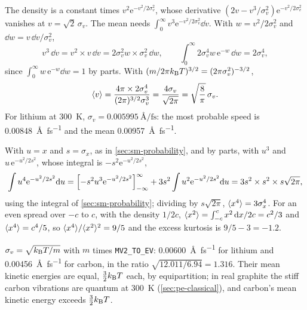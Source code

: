 The density is a constant times $v^2\mathrm{e}^
{-v^2/2\sigma_v^2}$, whose derivative $(2v - v^3/\sigma_v^2)\mathrm{e}^{
-v^2/2\sigma_v^2}$ vanishes at $v = \sqrt2\,\sigma_v$. The mean needs
$\int_0^\infty v^3\mathrm{e}^{-v^2/2\sigma_v^2}\dd v$. With $w =
v^2/2\sigma_v^2$ and $\dd w = v\,\dd v/\sigma_v^2$,
\begin{equation*}
   v^3\,\dd v = v^2\times v\,\dd v = 2\sigma_v^2w\times\sigma_v^2\,\dd w ,
   \qquad
   \int_0^\infty2\sigma_v^4w\,\mathrm{e}^{-w}\,\dd w = 2\sigma_v^4 ,
\end{equation*}
since $\int_0^\infty w\,\mathrm{e}^{-w}\dd w = 1$ by parts. With $(m/2\pi k_{\mathrm{B}}
T)^{3/2} = (2\pi\sigma_v^2)^{-3/2}$,
\begin{equation*}
   \langle v \rangle = \frac{4\pi\times2\sigma_v^4}{(2\pi)^{3/2}\sigma_v^3}
   = \frac{4\sigma_v}{\sqrt{2\pi}} = \sqrt{\frac8\pi}\,\sigma_v .
\end{equation*}
For lithium at \SI{300}{\kelvin}, $\sigma_v =
\SI{0.005995}{\angstrom\per\femto\second}$: the most probable speed is
\SI{0.00848}{\angstrom\per\femto\second} and the mean
\SI{0.00957}{\angstrom\per\femto\second}.

With $u = x$ and $s = \sigma_x$, as in
\cref{sec:sm-probability}, and by parts, with $u^3$ and
$u\,\mathrm{e}^{-u^2/2s^2}$, whose integral is $-s^2\mathrm{e}^{-u^2/2s^2}$,
\begin{equation*}
   \int u^4\mathrm{e}^{-u^2/2s^2}\mathrm{d} u
   = \Bigl[-s^2u^3\mathrm{e}^{-u^2/2s^2}\Bigr]_{-\infty}^{\infty}
   + 3s^2\int u^2\mathrm{e}^{-u^2/2s^2}\mathrm{d} u = 3s^2\times s^2\times
   s\sqrt{2\pi} ,
\end{equation*}
using the integral of \cref{sec:sm-probability}; dividing by
$s\sqrt{2\pi}$, $\langle x^4 \rangle = 3\sigma_x^4$. For an even spread over $-c$ to
$c$, with the density $1/2c$, $\langle x^2 \rangle = \int_{-c}^cx^2\,\mathrm{d} x/2c = c^2/3$ and $\langle x^4 \rangle =
c^4/5$, so $\langle x^4 \rangle/\langle x^2 \rangle^2 = 9/5$ and the excess kurtosis is $9/5 -
3 = -1.2$.

$\sigma_v = \sqrt{k_{\mathrm{B}} T/m}$ with $m$ times
\texttt{MV2\_TO\_EV}: \SI{0.00600}{\angstrom\per\femto\second} for
lithium and \SI{0.00456}{\angstrom\per\femto\second} for carbon, in the
ratio $\sqrt{12.011/6.94} = 1.316$. Their mean kinetic energies are equal,
$\frac32k_{\mathrm{B}} T$ each, by equipartition; in real graphite the stiff carbon
vibrations are quantum at \SI{300}{\kelvin} (\cref{sec:pe-classical}),
and carbon's mean kinetic energy exceeds $\frac32k_{\mathrm{B}} T$.

